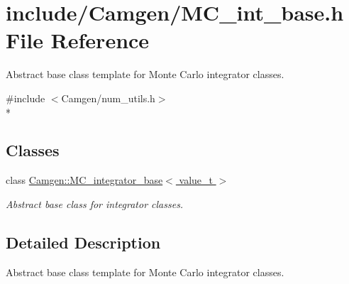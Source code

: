 \hypertarget{a00693}{}\section{include/\+Camgen/\+M\+C\+\_\+int\+\_\+base.h File Reference}
\label{a00693}


Abstract base class template for Monte Carlo integrator classes.  


{\ttfamily \#include $<$Camgen/num\+\_\+utils.\+h$>$}\\*
\subsection*{Classes}
\begin{DoxyCompactItemize}
\item 
class \hyperlink{a00370}{Camgen\+::\+M\+C\+\_\+integrator\+\_\+base$<$ value\+\_\+t $>$}
\begin{DoxyCompactList}\small\item\em Abstract base class for integrator classes. \end{DoxyCompactList}\end{DoxyCompactItemize}


\subsection{Detailed Description}
Abstract base class template for Monte Carlo integrator classes. 

